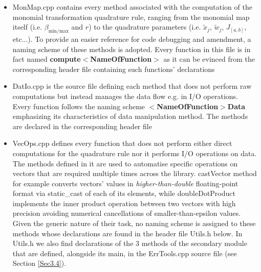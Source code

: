 \documentclass[a4paper, twosided]{book}
\begin{document}
\begin{itemize}
    \item \colorbox{poliGrayBlue}{MonMap.cpp} contains every method associated with the computation of the monomial transformation quadrature rule, ranging from the monomial map itself (i.e. $\beta_{\text{min/max}}$ and $r$) to the quadrature parameters (i.e. $\tilde{x}_j$, $\tilde{w}_j$, $J_{[a,b]}$, etc...). To provide an easier reference for code debugging and amendment, a naming scheme of these methods is adopted. Every function in this file is in fact named \color{poliDarkBlue} \textbf{compute}$\boldsymbol{<}$\textbf{NameOfFunction$\boldsymbol{>}$} \color{black} as it can be evinced from the corresponding header file containing such functions' declarations
    \newpage      
    \item \colorbox{poliGrayBlue}{DatIo.cpp} is the source file defining each method that does not perform raw computations but instead manages the data flow e.g. in I/O operations. Every function follows the naming scheme \color{poliDarkBlue} $\boldsymbol{<}$\textbf{NameOfFunction$\boldsymbol{>}$}\textbf{Data} \color{black} emphasizing its characteristics of data manipulation method. The methods are declared in the corresponding header file
    \vspace{0.5cm}
    \vspace{0.5cm}
    \item \colorbox{poliGrayBlue}{VecOps.cpp} defines every function that does not perform either direct computations for the quadrature rule nor it performs I/O operations on data. The methods defined in it are used to automatise specific operations on vectors that are required multiple times across the library. \colorbox{poliGrayBlue}{castVector} method for example converts vectors' values in \textsl{higher-than-double} floating-point format via \colorbox{poliGrayBlue}{static\_cast} of each of its elements, while \colorbox{poliGrayBlue}{doubleDotProduct} implements the inner product operation between two vectors with high precision avoiding numerical cancellations of smaller-than-epsilon values. Given the generic nature of their task, no naming scheme is assigned to these methods whose declarations are found in the header file \colorbox{poliGrayBlue}{Utils.h} below. In \colorbox{poliGrayBlue}{Utils.h} we also find declarations of the $3$ methods of the secondary module that are defined, alongside its \colorbox{poliGrayBlue}{main}, in the \colorbox{poliGrayBlue}{ErrTools.cpp} source file (see Section \ref{Sec3.4}).
    

\end{itemize}
\end{document}
